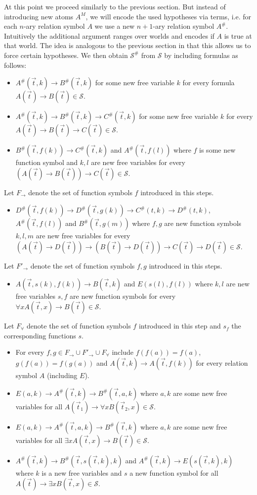 \documentclass[a4paper,12pt]{report}
\theoremstyle{definition}
\theoremstyle{definition}
\theoremstyle{definition}
\theoremstyle{definition}
\theoremstyle{definition}
\theoremstyle{definition}
\theoremstyle{definition}
\begin{document}
	At this point we proceed similarly to the previous section. But instead of introducing new atoms $A^M$, we will encode the used hypotheses via terms, i.e. for each $n$-ary relation symbol $A$ we use a new $n+1$-ary relation symbol $A^\#$. Intuitively the additional argument ranges over worlds and encodes if $A$ is true at that world. The idea is analogous to the previous section in that this allows us to force certain hypotheses. We then obtain $\mathcal S^\#$ from $\mathcal S$ by including formulas as follows:
	\begin{itemize}
		\item $A^\#(\vec t, k)\to B^\#(\vec t, k)$ for some new free variable $k$ for every formula $A(\vec t)\to B(\vec t)\in\mathcal S$.
		\item $A^\#(\vec t, k)\to B^\#(\vec t, k)\to C^\#(\vec t, k)$ for some new free variable $k$ for every $A(\vec t)\to B(\vec t)\to C(\vec t)\in\mathcal S$.
		\item $B^\#(\vec t, f(k))\to C^\#(\vec t, k)$ and $A^\#(\vec t, f(l))$ where $f$ is some new function symbol and $k, l$ are new free variables for every $(A(\vec t)\to B(\vec t))\to C(\vec t)\in\mathcal S$.
	\end{itemize}
	Let $F_\to$ denote the set of function symbols $f$ introduced in this steps.
	\begin{itemize}
		\item $D^\#(\vec t, f(k))\to D^\#(\vec t, g(k))\to C^\#(t, k)\to D^\#(t, k)$, $A^\#(\vec t, f(l))$ and $B^\#(\vec t, g(m))$ where $f, g$ are new function symbols $k,l,m$ are new free variables for every $(A(\vec t)\to D(\vec t))\to (B(\vec t)\to D(\vec t))\to C(\vec t)\to D(\vec t)\in\mathcal S$.
	\end{itemize}
	Let $F'_\to$ denote the set of function symbols $f, g$ introduced in this steps.
	\begin{itemize}
		\item $A(\vec t, s(k), f(k))\to B(\vec t, k)$ and $E(s(l), f(l))$ where $k,l$ are new free variables $s, f$ are new function symbols for every $\forall xA(\vec t, x)\to B(\vec t)\in\mathcal S$.
	\end{itemize}
	Let $F_\forall$ denote the set of function symbols $f$ introduced in this step and $s_f$ the corresponding functions $s$.
	\begin{itemize}
		\item For every $f, g\in F_\to\cup F'_\to\cup F_\forall$ include $f(f(a)) = f(a)$, $g(f(a)) = f(g(a))$ and $A(\vec t, k)\to A(\vec t, f(k))$ for every relation symbol $A$ (including $E$).
		\item $E(a, k)\to A^\#(\vec t, k)\to B^\#(\vec t, a, k)$ where $a, k$ are some new free variables for all $A(\vec t_1)\to \forall xB(\vec t_2, x)\in\mathcal S$.
		\item $E(a, k)\to A^\#(\vec t, a, k)\to B^\#(\vec t, k)$ where $a, k$ are some new free variables for all $\exists xA(\vec t, x)\to B(\vec t)\in\mathcal S$.
		\item $A^\#(\vec t, k)\to B^\#(\vec t, s(\vec t, k), k)$ and $A^\#(\vec t, k)\to E(s(\vec t, k), k)$ where $k$ is a new free variables and $s$ a new function symbol for all $A(\vec t)\to \exists xB(\vec t, x)\in\mathcal S$.
	\end{itemize}
\end{document}

